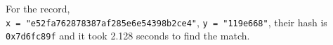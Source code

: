 \documentclass[conference]{IEEEtran}
\begin{document}
For the record,\\ \verb|x = "e52fa762878387af285e6e54398b2ce4"|, \verb|y = "119e668"|,
their hash is \verb|0x7d6fc89f| and it took 2.128 seconds to find the match.






%
%







%
%
\end{document}
